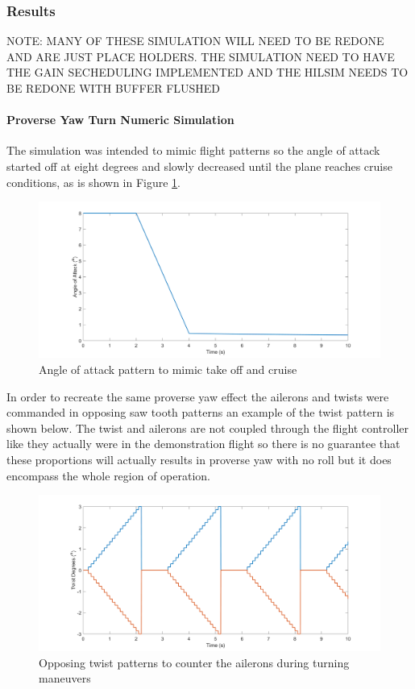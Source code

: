 \documentclass[11pt]{ucthesis}
\begin{document}
\subsubsection{Results}
{\color{red} NOTE: MANY OF THESE SIMULATION WILL NEED TO BE REDONE AND ARE JUST PLACE HOLDERS. THE SIMULATION NEED TO HAVE THE GAIN SECHEDULING IMPLEMENTED AND THE HILSIM NEEDS TO BE REDONE WITH BUFFER FLUSHED}

\paragraph{Proverse Yaw Turn Numeric Simulation}
The simulation was intended to mimic flight patterns so the angle of attack started off at eight degrees and slowly decreased until the plane reaches cruise conditions, as is shown in Figure \ref{fig:AOAPat}.

\begin{figure}[h]
\centering
\includegraphics[width=1\linewidth]{Figures/ProverseYawAoA.png}
\caption{Angle of attack pattern to mimic take off and cruise}
\label{fig:AOAPat}
\end{figure}

In order to recreate the same proverse yaw effect the ailerons and twists were commanded in opposing saw tooth patterns an example of the twist pattern is shown below. The twist and ailerons are not coupled through the flight controller like they actually were in the demonstration flight so there is no guarantee that these proportions will actually results in proverse yaw with no roll but it does encompass the whole region of operation. 

\begin{figure}[h]
\centering
\includegraphics[width=1\linewidth]{Figures/ProverseYawTwist.png}
\caption{Opposing twist patterns to counter the ailerons during turning maneuvers}
\label{fig:APTwist}
\end{figure}
\end{document}
